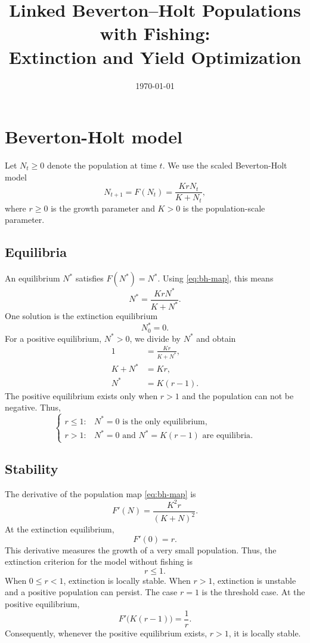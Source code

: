 \documentclass{article}
\title{Linked Beverton--Holt Populations with Fishing:\\ Extinction and Yield Optimization}
\author{}
\date{\today}
\numberwithin{equation}{section}
\begin{document}
\maketitle
\section{Beverton-Holt model}
Let $N_t \geq 0$ denote the population at time $t$. We use the
scaled Beverton-Holt model
\begin{equation}
    \label{eq:bh-map}
    N_{t+1} = F(N_t)
            = \frac{K r N_t}{K + N_t},
\end{equation}
where $r \geq 0$ is the growth parameter and $K>0$ is the
population-scale parameter.
\subsection{Equilibria}
An equilibrium $N^*$ satisfies $F(N^*)=N^*$. Using \eqref{eq:bh-map},
this means
\begin{equation*}
    N^* = \frac{K r N^*}{K + N^*}.
\end{equation*}
One solution is the extinction equilibrium
\begin{equation*}
    N^*_0=0.
\end{equation*}
For a positive equilibrium, $N^*>0$, we divide by $N^*$ and obtain
\begin{align*}
    1 &= \frac{K r}{K+N^*},\\
    K+N^* &= Kr,\\
    N^* &= K(r-1).
\end{align*}
The positive equilibrium exists only when $r>1$ and the population can
not be negative. Thus,
\begin{equation*}
    \begin{cases}
        r\leq 1: & N^*=0 \text{ is the only equilibrium},\\
        r>1: & N^*=0 \text{ and } N^*=K(r-1) \text{ are equilibria}.
    \end{cases}
\end{equation*}
\subsection{Stability}
The derivative of the population map \eqref{eq:bh-map} is
\begin{equation*}
    F'(N)=\frac{K^2r}{(K+N)^2}.
\end{equation*}
At the extinction equilibrium,
\begin{equation*}
    F'(0)=r.
\end{equation*}
This derivative measures the growth of a very small population. Thus,
the extinction criterion for the model without fishing is
\begin{equation*}
    r \leq 1.
\end{equation*}
When $0\leq r<1$, extinction is locally stable. When $r>1$, extinction
is unstable and a positive population can persist. The case $r=1$ is
the threshold case.
At the positive equilibrium,
\begin{equation*}
    F'\bigl(K(r-1)\bigr)=\frac{1}{r}.
\end{equation*}
Consequently, whenever the positive equilibrium exists, $r>1$, it is
locally stable.
\end{document}
